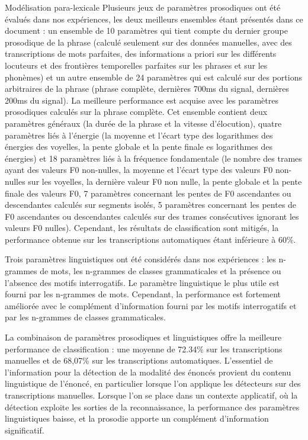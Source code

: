 \documentclass{style/these}
\begin{document}
\begin{part}{Modélisation para-lexicale}
Plusieurs jeux de paramètres prosodiques ont été évalués dans nos expériences, les deux meilleurs ensembles étant présentés dans ce document : un ensemble de 10 paramètres qui tient compte du dernier groupe prosodique de la phrase (calculé seulement sur des données manuelles, avec des transcriptions de mots parfaites, des informations a priori sur les différents locuteurs et des frontières temporelles parfaites sur les phrases et sur les phonèmes) et un autre ensemble de 24 paramètres qui est calculé sur des portions arbitraires de la phrase (phrase complète, dernières 700ms du signal, dernières 200ms du signal).  
La meilleure performance est acquise avec les paramètres prosodiques calculés sur la phrase complète. 
Cet ensemble contient deux paramètres généraux (la durée de la phrase et la vitesse d'élocution), quatre paramètres liés à l'énergie (la moyenne et l'écart type des logarithmes des énergies des voyelles, la pente globale et la pente finale es logarithmes des énergies) et 18 paramètres liés à la fréquence fondamentale (le nombre des trames ayant des valeurs F0 non-nulles, la moyenne et l'écart type des valeurs F0 non-nulles sur les voyelles, la dernière valeur F0 non nulle, la pente globale et la pente finale des valeurs F0, 7 paramètres concernant les pentes de F0 ascendantes ou descendantes calculés sur segments isolés, 5 paramètres concernant les pentes de F0 ascendantes ou descendantes calculés sur des trames consécutives ignorant les valeurs F0 nulles). 
Cependant, les résultats de classification sont mitigés, la performance obtenue sur les transcriptions automatiques étant inférieure à 60\%. 

Trois paramètres linguistiques ont été considérés dans nos expériences : les n-grammes de mots, les n-grammes de classes grammaticales et la présence ou l'absence des motifs interrogatifs. Le paramètre linguistique le plus utile est fourni par les n-grammes de mots. 
Cependant, la performance est fortement améliorée avec le complément d'information fourni par les motifs interrogatifs et par les n-grammes de classes grammaticales.

La combinaison de paramètres prosodiques et linguistiques offre la meilleure performance de classification : une moyenne de 72.34\% sur les transcriptions manuelles et de 68,07\% sur les transcriptions automatiques. 
L'essentiel de l'information pour la détection de la modalité des énoncés provient du contenu linguistique de l'énoncé, en particulier lorsque l'on applique les détecteurs sur des transcriptions manuelles. 
Lorsque l'on se place dans un contexte applicatif, où la détection exploite les sorties de la reconnaissance, la performance des paramètres linguistiques baisse, et la prosodie apporte un complément d'information significatif.


\end{part}
\end{document}
